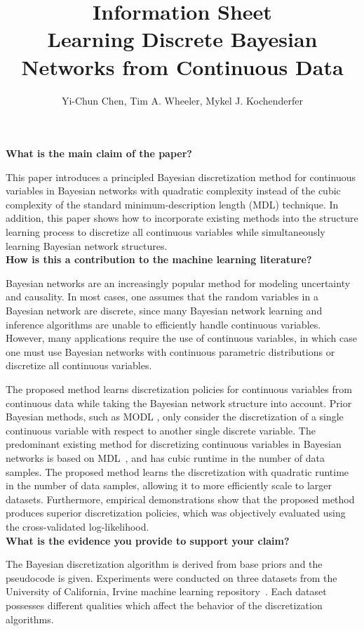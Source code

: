 \documentclass{article}
\title{Information Sheet \\ {\large Learning Discrete Bayesian Networks from Continuous Data}}
\author{\normalsize Yi-Chun Chen, Tim A. Wheeler, Mykel J. Kochenderfer}
\date{}
\begin{document}
\maketitle

\noindent
\textbf{What is the main claim of the paper?}

This paper introduces a principled Bayesian discretization method for continuous variables in Bayesian networks with quadratic complexity instead of the cubic complexity of the standard minimum-description length (MDL) technique.
In addition, this paper shows how to incorporate existing methods into the structure learning process to discretize all continuous variables while simultaneously learning Bayesian network structures.\\[0em]

\noindent
\textbf{How is this a contribution to the machine learning literature?}

Bayesian networks are an increasingly popular method for modeling uncertainty and causality.
In most cases, one assumes that the random variables in a Bayesian network are discrete, since many Bayesian network learning and inference algorithms are unable to efficiently handle continuous variables.
However, many applications require the use of continuous variables, in which case one must use Bayesian networks with continuous parametric distributions or discretize all continuous variables.

The proposed method learns discretization policies for continuous variables from continuous data while taking the Bayesian network structure into account.
Prior Bayesian methods, such as MODL \citep{Boulle_2006, Lustgarten_2011}, only consider the discretization of a single continuous variable with respect to another single discrete variable.
The predominant existing method for discretizing continuous variables in Bayesian networks is based on MDL~\citep{Friedman_1996}, and has cubic runtime in the number of data samples.
The proposed method learns the discretization with quadratic runtime in the number of data samples, allowing it to more efficiently scale to larger datasets.
Furthermore, empirical demonstrations show that the proposed method produces superior discretization policies, which was objectively evaluated using the cross-validated log-likelihood.\\[0em]

\noindent
\textbf{What is the evidence you provide to support your claim?}

The Bayesian discretization algorithm is derived from base priors and the pseudocode is given.
Experiments were conducted on three datasets from the University of California, Irvine machine learning repository~\citep{Lichman_2013}.
Each dataset possesses different qualities which affect the behavior of the discretization algorithms.
\end{document}
